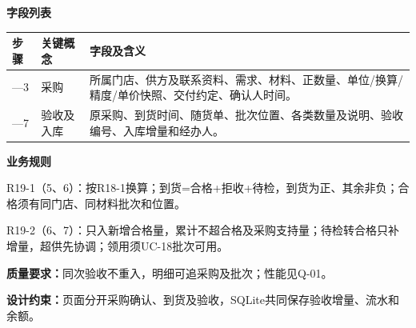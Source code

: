 \documentclass[UTF8,a4paper,zihao=-4,fontset=none]{ctexart}
\begin{document}
\noindent\textbf{字段列表}\par
{\setlength{\tabcolsep}{3pt}\renewcommand{\arraystretch}{1.04}
\noindent\begin{tabular}{@{}>{\raggedright\arraybackslash}p{1.2cm}>{\raggedright\arraybackslash}p{2.2cm}>{\raggedright\arraybackslash}p{12.3cm}@{}}
\toprule
步骤 & 关键概念 & 字段及含义 \\ \midrule
1—3 & 采购 & 所属门店、供方及联系资料、需求、材料、正数量、单位/换算/精度/单价快照、交付约定、确认人时间。 \\
4—7 & 验收及入库 & 原采购、到货时间、随货单、批次位置、各类数量及说明、验收编号、入库增量和经办人。 \\
\bottomrule
\end{tabular}\par}
\smallskip
\noindent\textbf{业务规则}\par
\noindent R19-1（5、6）：按R18-1换算；到货=合格+拒收+待检，到货为正、其余非负；合格须有同门店、同材料批次和位置。\par
\noindent R19-2（6、7）：只入新增合格量，累计不超合格及采购支持量；待检转合格只补增量，超供先协调；领用须UC-18批次可用。\par
\smallskip
\noindent\textbf{质量要求：}同次验收不重入，明细可追采购及批次；性能见Q-01。\par
\noindent\textbf{设计约束：}页面分开采购确认、到货及验收，SQLite共同保存验收增量、流水和余额。\par
\endgroup
\clearpage
\end{document}
